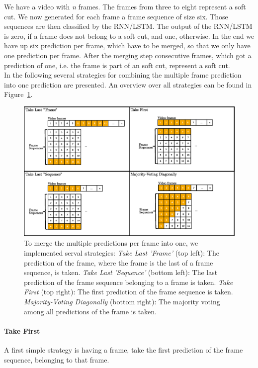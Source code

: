 We have a video with \textit{n} frames.
The frames from three to eight represent a soft cut.
We now generated for each frame a frame sequence of size six.
Those sequences are then classified by the RNN/LSTM.
The output of the RNN/LSTM is zero, if a frame does not belong to a soft cut, and one, otherwise.
In the end we have up six prediction per frame, which have to be merged, so that we only have one prediction per frame.
After the merging step consecutive frames, which got a prediction of one, i.e. the frame is part of an soft cut, represent a soft cut. \\
In the following several strategies for combining the multiple frame prediction into one prediction are presented.
An overview over all strategies can be found in Figure~\ref{fig:merging_strategies}.
\begin{figure}[!htb]
	\centering
	\includegraphics[scale=.5]{images/merging_strategies.eps}
	\caption{To merge the multiple predictions per frame into one, we implemented serval strategies: \textit{Take Last 'Frame'} (top left): The prediction of the frame, where the frame is the last of a frame sequence, is taken. \textit{Take Last 'Sequence'} (bottom left): The last prediction of the frame sequence belonging to a frame is taken. \textit{Take First} (top right): The first prediction of the frame sequence is taken. \textit{Majority-Voting Diagonally} (bottom right): The majority voting among all predictions of the frame is taken.}
	\label{fig:merging_strategies}
\end{figure}
\paragraph{Take First}
A first simple strategy is having a frame, take the first prediction of the frame sequence, belonging to that frame.

